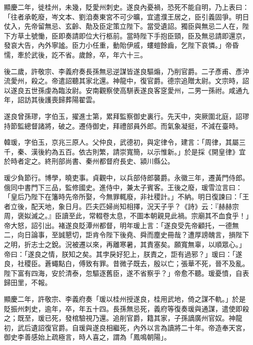 \begin{pinyinscope}
 顯慶二年，徙桂州，未幾，貶愛州刺史。遂良內憂禍，恐死不能自明，乃上表曰：「往者承乾廢，岑文本、劉洎奏東宮不可少曠，宜遣濮王居之，臣引義固爭。明日仗入，先帝留無忌、玄齡、勣及臣定策立陛下。當受遺詔。獨臣與無忌二人在，陛下方草土號慟，臣即奏請即位大行柩前。當時陛下手抱臣頸，臣及無忌請即還京，發哀大告，內外寧謐。臣力小任重，動貽伊戚，螻螘餘齒，乞陛下哀憐。」帝昏懦，牽於武後，訖不省。歲餘，卒，年六十三。



 後二歲，許敬宗、李義府奏長孫無忌逆謀皆遂良驅煽，乃削官爵。二子彥甫、彥沖流愛州，殺之。帝遣詔聽其家北還。神龍中，復官爵。德宗追贈太尉。文宗時，詔以遂良五世孫虔為臨汝尉。安南觀察使高駢表遂良客窆愛州，二男一孫祔。咸通九年，詔訪其後護喪歸葬陽翟雲。



 遂良曾孫璆，字伯玉，擢進士第，累拜監察御史裏行。先天中，突厥圍北庭，詔璆持節監總督諸將，破之。遷侍御史，拜禮部員外郎。而氣象凝挺，不減在臺時。



 韓瑗，字伯玉，京兆三原人。父仲良，武德初，與定律令，建言：「周律，其屬三千，秦、漢後約為五百。依古則繁，請崇寬簡，以示惟新。」於是採《開皇律》宜於時者定之。終刑部尚書、秦州都督府長史、潁川縣公。



 瑗少負節行。博學，曉吏事。貞觀中，以兵部侍郎襲爵。永徽三年，遷黃門侍郎。俄同中書門下三品，監修國史。進侍中，兼太子賓客。王後之廢，瑗雪泣言曰：「皇后乃陛下在籓時先帝所娶，今無罪輒廢，非社稷計。」不納。明日復諫曰：「王者立後，配天地，象日月。匹夫匹婦尚知相擇，況天子乎？《詩》云：『赫赫宗周，褒姒滅之。』臣讀至此，常輟卷太息，不圖本朝親見此禍。宗廟其不血食乎！」帝大怒，詔引出。褚遂良貶潭州都督，明年瑗上言：「遂良受先帝顧托，一德無二，向日論事，至誠懇切，詎肯令陛下後堯、舜而塵史冊哉？遭厚謗醜言，損陛下之明，折志士之銳。況被遷以來，再離寒暑，其責塞矣。願寬無辜，以順眾心。」帝曰：「遂良之情，朕知之矣。其孛戾好犯上，朕責之，詎有過邪？」瑗曰：「遂良，社稷臣。蒼蠅點白，傅致有罪。昔微子既去，殷以亡；張華不死，晉不及亂。陛下富有四海，安於清泰，忽驅逐舊臣，遂不省察乎？」帝愈不聽。瑗憂憤，自表歸田里，不報。



 顯慶二年，許敬宗、李義府奏「瑗以桂州授遂良，桂用武地，倚之謀不軌。」於是貶振州刺史，逾年，卒，年五十四。長孫無忌死，義府等復奏瑗與通謀，遣使即殺之；既至，瑗已死，發棺驗視乃還。追削官爵，籍其家，子孫謫廣州官奴。神龍初，武后遺詔復官爵。自瑗與遂良相繼死，內外以言為讀將二十年。帝造奉天宮，御史李善感始上疏極言，時人喜之，謂為「鳳鳴朝陽」。




\end{pinyinscope}
